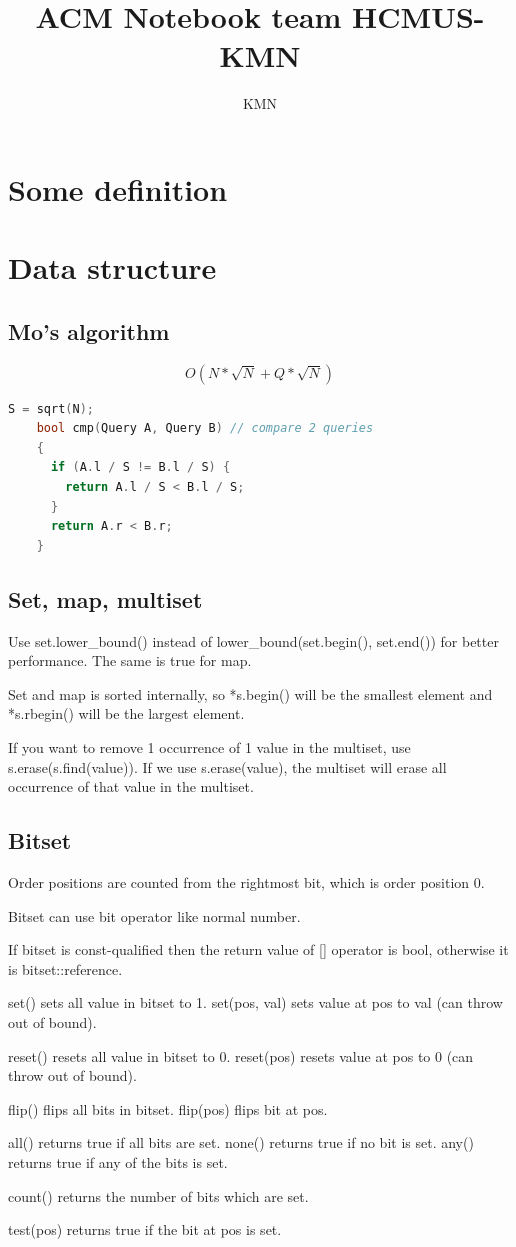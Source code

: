 \documentclass[a4paper, 12pt, oneside, landscape]{article}
\title{ACM Notebook team HCMUS-KMN}
\author{KMN}
\begin{document}
	\begin{multicols}{2}
	\tableofcontents
	\small
	
\section{Some definition}
	

\section{Data structure}
	\subsection{Mo's algorithm}
    \[O(N * \sqrt{N} + Q * \sqrt{N}) \]
	\begin{lstlisting}[language=C++]
    S = sqrt(N);
    bool cmp(Query A, Query B) // compare 2 queries
    {
      if (A.l / S != B.l / S) {
        return A.l / S < B.l / S;
      }
      return A.r < B.r;
    }
    \end{lstlisting}
	
	\subsection{Set, map, multiset}
	Use set.lower_bound() instead of lower_bound(set.begin(), set.end()) for better performance. The same is true for map. \par 
	Set and map is sorted internally, so *s.begin() will be the smallest element and *s.rbegin() will be the largest element. \par 
	If you want to remove 1 occurrence of 1 value in the multiset, use s.erase(s.find(value)). If we use s.erase(value), the multiset will erase all occurrence of that value in the multiset.
	
	\subsection{Bitset}
	Order positions are counted from the rightmost bit, which is order position 0. \par 
	Bitset can use bit operator like normal number. \par
	If bitset is const-qualified then the return value of [] operator is bool, otherwise it is bitset::reference. \par
	set() sets all value in bitset to 1. set(pos, val) sets value at pos to val (can throw out of bound). \par
	reset() resets all value in bitset to 0. reset(pos) resets value at pos to 0 (can throw out of bound). \par 
	flip() flips all bits in bitset. flip(pos) flips bit at pos. \par 
	all() returns true if all bits are set. none() returns true if no bit is set. any() returns true if any of the bits is set. \par 
	count() returns the number of bits which are set. \par 
	test(pos) returns true if the bit at pos is set.
	

\end{multicols}
\end{document}
